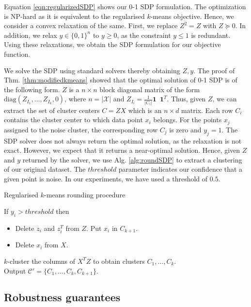 \documentclass[12pt]{article}
\newcommand{\mc}{\mathcal}
\newcommand{\mb}{\mathbf}
\newcommand{\diag}{\text{diag}}
\begin{document}
Equation \ref{eqn:regularizedSDP} shows our 0-1 SDP formulation. The optimization is NP-hard as it is equivalent to the regularised $k$-means objective. Hence, we consider a convex relaxation of the same. First, we replace $Z^2 = Z$ with $Z \succeq 0$. In addition, we relax $y \in \{0, 1\}^n$ to $y \geq 0$, as the constraint $y\leq 1$ is redundant. Using these relaxations, we obtain the SDP formulation for our objective function.

We solve the SDP using standard solvers \cite{yang2015sdpnal+} thereby obtaining $Z, y$. 
The proof of Thm. \ref{thm:modifiedkmeans} showed that the optimal solution of 0-1 SDP is of the following form. $Z$ is a $n\times n$ block diagonal matrix of the form $\diag(Z_{I_1}, \ldots, Z_{I_k}, 0)$, where $n = |\mc X|$ and $Z_{I_i} = \frac{1}{|C_i|}\mb 1 \enspace\mb 1^T$. Thus, given $Z$, we can extract the set of cluster centers $C = ZX$ which is an $n \times d$ matrix. Each row $C_i$ contains the cluster center to which data point $x_i$ belongs. For the points $x_j$ assigned to the noise cluster, the corresponding row $C_j$ is zero and $y_j = 1$. The SDP solver does not always return the optimal solution, as the relaxation is not exact. However, we expect that it returns a near-optimal solution. Hence, given $Z$ and $y$ returned by the solver, we use Alg. \ref{alg:roundSDP} to extract a clustering of our original dataset. The $threshold$ parameter indicates our confidence that a given point is noise. In our experiments, we have used a threshold of $0.5$. 

\SetAlgoNoLine
\LinesNumbered
\begin{algorithm}[t]
\caption{Regularised $k$-means rounding procedure}
\label{alg:roundSDP}
	\Indp\KwIn{ $Z \subset \mathbb{R}^{n\times n}$, $y \subset \mathbb{R}^{n}$, $\mc{X}$, and $threshold \in [0,1]$.}
	\KwOut{$\mc C'$.}
	
	If $y_i > threshold$ then
	\begin{itemize}[nolistsep] 
		\item[] Delete $z_i$ and $z_i^T$ from $Z$. Put $x_i$ in $C_{k+1}$.
		\item[] Delete $x_i$ from $X$.
	\end{itemize}
	$k$-cluster the columns of $X^TZ$ to obtain clusters $C_1, \ldots, C_k$.\\
	Output $\mc C' = \{C_1, \ldots, C_k, C_{k+1}\}$.
\end{algorithm}

\subsection{Robustness guarantees}
\label{subsection:sdpRobust}
\end{document}
